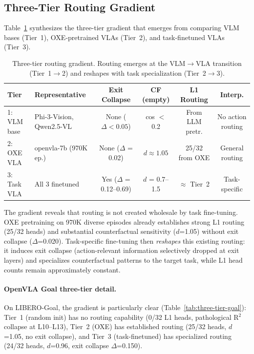 \documentclass[letterpaper]{article}
\begin{document}
\subsection{Three-Tier Routing Gradient}
\label{sec:three-tier}

Table~\ref{tab:three-tier} synthesizes the three-tier gradient that emerges from comparing VLM bases (Tier~1), OXE-pretrained VLAs (Tier~2), and task-finetuned VLAs (Tier~3).

\begin{table}[t]
\centering
\caption{Three-tier routing gradient. Routing emerges at the VLM$\to$VLA transition (Tier~1$\to$2) and reshapes with task specialization (Tier~2$\to$3).}
\label{tab:three-tier}
\small
\begin{tabular}{lp{2.4cm}cccc}
\toprule
Tier & Representative & Exit Collapse & CF (empty) & L1 Routing & Interp. \\
\midrule
1: VLM base      & Phi-3-Vision, Qwen2.5-VL & None ($\Delta < 0.05$)       & cos $<$ 0.2 & From LLM pretr. & No action routing \\
2: OXE VLA       & openvla-7b (970K ep.)     & None ($\Delta$ = 0.02)       & $d \approx 1.05$ & 25/32 from OXE  & General routing \\
3: Task VLA      & All 3 finetuned           & Yes ($\Delta$ = 0.12--0.69)  & $d$ = 0.7--1.5   & $\approx$ Tier~2 & Task-specific \\
\bottomrule
\end{tabular}
\end{table}

The gradient reveals that routing is not created wholesale by task fine-tuning.
OXE pretraining on 970K diverse episodes already establishes strong L1 routing (25/32 heads) and substantial counterfactual sensitivity ($d$=1.05) without exit collapse ($\Delta$=0.020).
Task-specific fine-tuning then \emph{reshapes} this existing routing: it induces exit collapse (action-relevant information selectively dropped at exit layers) and specializes counterfactual patterns to the target task, while L1 head counts remain approximately constant.

\paragraph{OpenVLA Goal three-tier detail.}
On LIBERO-Goal, the gradient is particularly clear (Table~\ref{tab:three-tier-goal}): Tier~1 (random init) has no routing capability (0/32 L1 heads, pathological R$^2$ collapse at L10--L13), Tier~2 (OXE) has established routing (25/32 heads, $d$=1.05, no exit collapse), and Tier~3 (task-finetuned) has specialized routing (24/32 heads, $d$=0.96, exit collapse $\Delta$=0.150).
\end{document}
